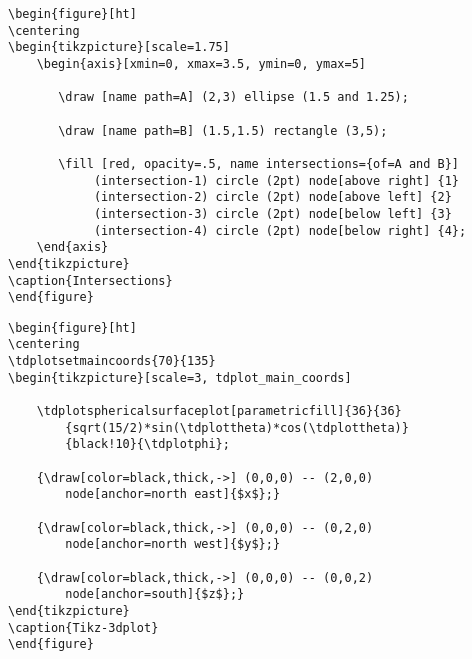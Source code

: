 




\newpage
\begin{verbatim}
\begin{figure}[ht]
\centering
\begin{tikzpicture}[scale=1.75]
	\begin{axis}[xmin=0, xmax=3.5, ymin=0, ymax=5]
	   
       \draw [name path=A] (2,3) ellipse (1.5 and 1.25);
	   
       \draw [name path=B] (1.5,1.5) rectangle (3,5);
       
       \fill [red, opacity=.5, name intersections={of=A and B}]
            (intersection-1) circle (2pt) node[above right] {1}
            (intersection-2) circle (2pt) node[above left] {2} 
            (intersection-3) circle (2pt) node[below left] {3} 
            (intersection-4) circle (2pt) node[below right] {4};
	\end{axis}
\end{tikzpicture}
\caption{Intersections}
\end{figure}
\end{verbatim}






\newpage
\begin{verbatim}
\begin{figure}[ht]
\centering
\tdplotsetmaincoords{70}{135}
\begin{tikzpicture}[scale=3, tdplot_main_coords]
    
    \tdplotsphericalsurfaceplot[parametricfill]{36}{36}
        {sqrt(15/2)*sin(\tdplottheta)*cos(\tdplottheta)}
        {black!10}{\tdplotphi};

    {\draw[color=black,thick,->] (0,0,0) -- (2,0,0) 
        node[anchor=north east]{$x$};}

    {\draw[color=black,thick,->] (0,0,0) -- (0,2,0) 
        node[anchor=north west]{$y$};}
    
    {\draw[color=black,thick,->] (0,0,0) -- (0,0,2) 
        node[anchor=south]{$z$};}
\end{tikzpicture}
\caption{Tikz-3dplot}
\end{figure}
\end{verbatim}

\newpage